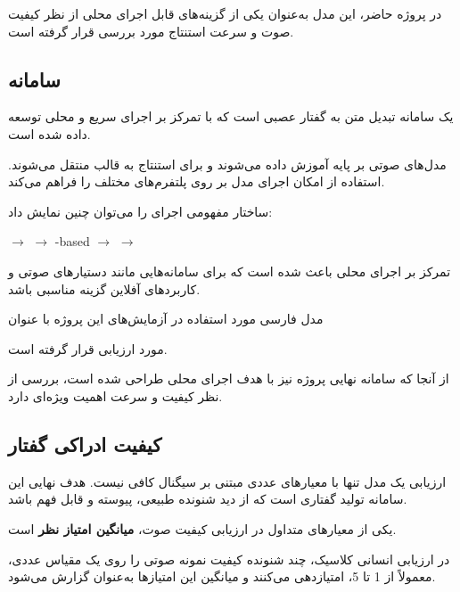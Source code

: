 در پروژه حاضر، این مدل به‌عنوان یکی از گزینه‌های قابل اجرای
محلی از نظر کیفیت صوت و سرعت استنتاج مورد بررسی قرار گرفته است.


\subsection{سامانه }

یک سامانه تبدیل متن به گفتار عصبی است که با تمرکز بر اجرای
سریع و محلی توسعه داده شده است.

مدل‌های صوتی  بر پایه  آموزش داده می‌شوند و
برای استنتاج به قالب
منتقل می‌شوند.
استفاده از  امکان اجرای مدل بر روی پلتفرم‌های
مختلف را فراهم می‌کند.

ساختار مفهومی اجرای  را می‌توان چنین نمایش داد:

\begin{center}
$\longrightarrow$
$\longrightarrow$
-based 
$\longrightarrow$
$\longrightarrow$
\end{center}

تمرکز  بر اجرای محلی باعث شده است که برای سامانه‌هایی
مانند دستیارهای صوتی و کاربردهای آفلاین گزینه مناسبی باشد.

مدل فارسی مورد استفاده در آزمایش‌های این پروژه با عنوان

\begin{center}
\end{center}

مورد ارزیابی قرار گرفته است.

از آنجا که سامانه نهایی پروژه نیز با هدف اجرای محلی طراحی شده
است، بررسی  از نظر کیفیت و سرعت اهمیت ویژه‌ای دارد.


\subsection{کیفیت ادراکی گفتار}

ارزیابی یک مدل  تنها با معیارهای عددی مبتنی بر سیگنال
کافی نیست.
هدف نهایی این سامانه تولید گفتاری است که از دید شنونده طبیعی،
پیوسته و قابل فهم باشد.

یکی از معیارهای متداول در ارزیابی کیفیت صوت،
\textbf{میانگین امتیاز نظر}
است.

در ارزیابی انسانی کلاسیک، چند شنونده کیفیت نمونه صوتی را روی
یک مقیاس عددی، معمولاً از 1 تا 5، امتیازدهی می‌کنند و میانگین
این امتیازها به‌عنوان  گزارش می‌شود.

